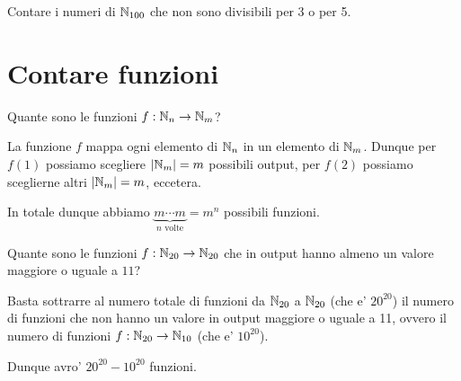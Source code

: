 \begin{example}
    Contare i numeri di $\mathbb{N}_{100}$ che non sono divisibili per 3 o per 5.
\end{example}

\section{Contare funzioni}
\begin{example}
    Quante sono le funzioni $f : \mathbb{N}_n \to \mathbb{N}_m$?
\end{example}
\begin{solution}
    La funzione $f$ mappa ogni elemento di $\mathbb{N}_n$ in un elemento di $\mathbb{N}_m$. Dunque per $f(1)$ possiamo scegliere $\left|\mathbb{N}_m\right| = m$ possibili output, per $f(2)$ possiamo sceglierne altri $\left|\mathbb{N}_m\right| = m$, eccetera. 
    
    In totale dunque abbiamo $\underbrace{m \cdots m}_{n \text{ volte}} = m^n$ possibili funzioni.
\end{solution}

\begin{example}
    Quante sono le funzioni $f : \mathbb{N}_{20} \to \mathbb{N}_{20}$ che in output hanno almeno un valore maggiore o uguale a $11$?
\end{example}
\begin{solution}
    Basta sottrarre al numero totale di funzioni da $\mathbb{N}_{20}$ a $\mathbb{N}_{20}$ (che e' $20^{20}$) il numero di funzioni che non hanno un valore in output maggiore o uguale a 11, ovvero il numero di funzioni $f : \mathbb{N}_{20} \to \mathbb{N}_{10}$ (che e' $10^{20}$).


    Dunque avro' $20^{20} - 10^{20}$ funzioni.
\end{solution}

